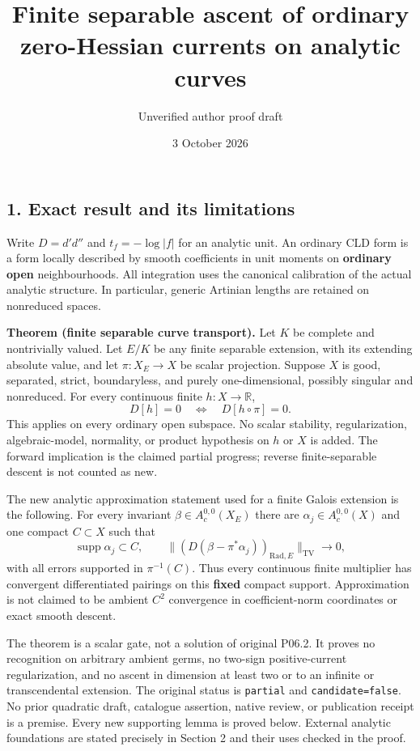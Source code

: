 \documentclass[11pt]{article}
\title{Finite separable ascent of ordinary zero-Hessian currents on
analytic curves}
\author{Unverified author proof draft}
\date{3 October 2026}
\begin{document}
\maketitle
\subsection{1. Exact result and its
limitations}\label{exact-result-and-its-limitations}

Write \(D=d'd''\) and \(t_f=-\log|f|\) for an analytic unit. An ordinary
CLD form is a form locally described by smooth coefficients in unit
moments on \textbf{ordinary open} neighbourhoods. All integration uses
the canonical calibration of the actual analytic structure. In
particular, generic Artinian lengths are retained on nonreduced spaces.

\textbf{Theorem (finite separable curve transport).} Let \(K\) be
complete and nontrivially valued. Let \(E/K\) be any finite separable
extension, with its extending absolute value, and let
\(\pi:X_E\longrightarrow X\) be scalar projection. Suppose \(X\) is
good, separated, strict, boundaryless, and purely one-dimensional,
possibly singular and nonreduced. For every continuous finite
\(h:X\longrightarrow\mathbb R\), \[
                D[h]=0\quad\Longleftrightarrow\quad
                D[h\circ\pi]=0.                       \tag{1}
\] This applies on every ordinary open subspace. No scalar stability,
regularization, algebraic-model, normality, or product hypothesis on
\(h\) or \(X\) is added. The forward implication is the claimed partial
progress; reverse finite-separable descent is not counted as new.

The new analytic approximation statement used for a finite Galois
extension is the following. For every invariant
\(\beta\in A_c^{0,0}(X_E)\) there are \(\alpha_j\in A_c^{0,0}(X)\) and
one compact \(C\subset X\) such that \[
 \operatorname{supp}\alpha_j\subset C,\qquad
 \big\|(D(\beta-\pi^*\alpha_j))_{\mathrm{Rad},E}\big\|_{\mathrm{TV}}
                         \longrightarrow0,             \tag{2}
\] with all errors supported in \(\pi^{-1}(C)\). Thus every continuous
finite multiplier has convergent differentiated pairings on this
\textbf{fixed} compact support. Approximation is not claimed to be
ambient \(C^2\) convergence in coefficient-norm coordinates or exact
smooth descent.

The theorem is a scalar gate, not a solution of original P06.2. It
proves no recognition on arbitrary ambient germs, no two-sign
positive-current regularization, and no ascent in dimension at least two
or to an infinite or transcendental extension. The original status is
\texttt{partial} and \texttt{candidate=false}. No prior quadratic draft,
catalogue assertion, native review, or publication receipt is a premise.
Every new supporting lemma is proved below. External analytic
foundations are stated precisely in Section 2 and their uses checked in
the proof.
\end{document}
